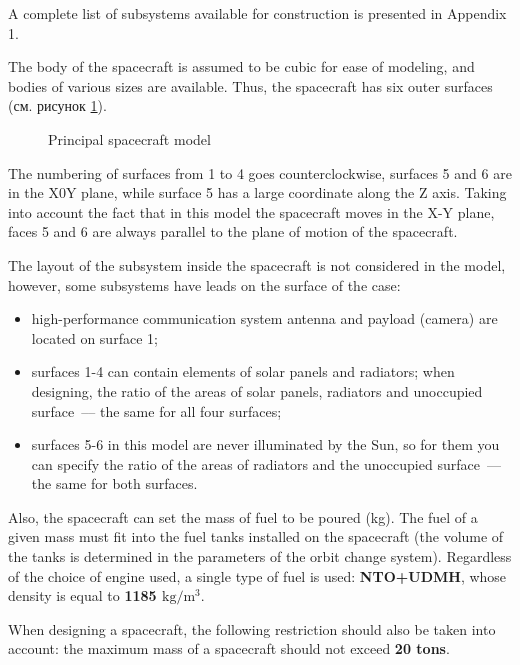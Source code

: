 \documentclass[12pt,a4paper]{article}
\begin{document}
A complete list of subsystems available for construction is presented in Appendix 1.

The body of the spacecraft is assumed to be cubic for ease of modeling, and bodies of various sizes are available. Thus, the spacecraft has six outer surfaces
(см. рисунок \ref{Pic:cube}).

\begin{figure}[tbh]
  \begin{center}
    \caption{Principal spacecraft model}
    \label{Pic:cube}
  \end{center}
\end{figure}

The numbering of surfaces from 1 to 4 goes counterclockwise, surfaces 5 and 6 are in the X0Y plane, while surface 5 has a large coordinate along the Z axis. Taking into account the fact that in this model the spacecraft moves in the X-Y plane, faces 5 and 6 are always parallel to the plane of motion of the spacecraft.

The layout of the subsystem inside the spacecraft is not considered in the model, however, some subsystems have leads on the surface of the case:

\begin{itemize}
\item high-performance communication system antenna and payload (camera) are located on surface 1;
\item surfaces 1-4 can contain elements of solar panels and radiators; when designing, the ratio of the areas of solar panels, radiators and unoccupied surface~--– the same for all four surfaces;
\item surfaces 5-6 in this model are never illuminated by the Sun, so for them you can specify the ratio of the areas of radiators and the unoccupied surface~--– the same for both surfaces.
\end{itemize}

Also, the spacecraft can set the mass of fuel to be poured (kg). The fuel of a given mass must fit into the fuel tanks installed on the spacecraft (the volume of the tanks is determined in the parameters of the orbit change system). Regardless of the choice of engine used, a single type of fuel is used: \textbf{NTO+UDMH}, whose density is equal to \textbf{1185
  $\text{kg}/\text{m}^3$}.

When designing a spacecraft, the following restriction should also be taken into account: the maximum mass of a spacecraft should not exceed \textbf{20 tons}.
\end{document}
